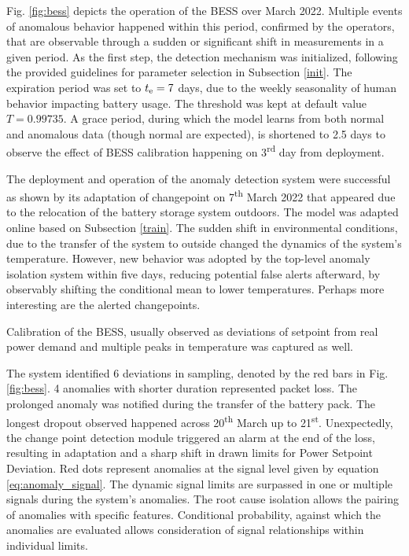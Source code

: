 Fig. \ref{fig:bess} depicts the operation of the BESS over March 2022. Multiple events of anomalous behavior happened within this period, confirmed by the operators, that are observable through a sudden or significant shift in measurements in a given period. As the first step, the detection mechanism was initialized, following the provided guidelines for parameter selection in Subsection \ref{init}. The expiration period was set to $t _{\text{e}} = 7$ days, due to the weekly seasonality of human behavior impacting battery usage. The threshold was kept at default value $T = 0.99735$. A grace period, during which the model learns from both normal and anomalous data (though normal are expected), is shortened to 2.5 days to observe the effect of BESS calibration happening on 3\textsuperscript{rd} day from deployment.

The deployment and operation of the anomaly detection system were successful as shown by its adaptation of changepoint on 7\textsuperscript{th} March 2022 that appeared due to the relocation of the battery storage system outdoors. The model was adapted online based on Subsection \ref{train}. The sudden shift in environmental conditions, due to the transfer of the system to outside changed the dynamics of the system's temperature. However, new behavior was adopted by the top-level anomaly isolation system within five days, reducing potential false alerts afterward, by observably shifting the conditional mean to lower temperatures. Perhaps more interesting are the alerted changepoints.

Calibration of the BESS, usually observed as deviations of setpoint from real power demand and multiple peaks in temperature was captured as well.

The system identified 6 deviations in sampling, denoted by the red bars in Fig. \ref{fig:bess}. 4 anomalies with shorter duration represented packet loss. The prolonged anomaly was notified during the transfer of the battery pack. The longest dropout observed happened across 20\textsuperscript{th} March up to 21\textsuperscript{st}. Unexpectedly, the change point detection module triggered an alarm at the end of the loss, resulting in adaptation and a sharp shift in drawn limits for Power Setpoint Deviation. Red dots represent anomalies at the signal level given by equation \eqref{eq:anomaly_signal}. The dynamic signal limits are surpassed in one or multiple signals during the system's anomalies. The root cause isolation allows the pairing of anomalies with specific features. Conditional probability, against which the anomalies are evaluated allows consideration of signal relationships within individual limits.

